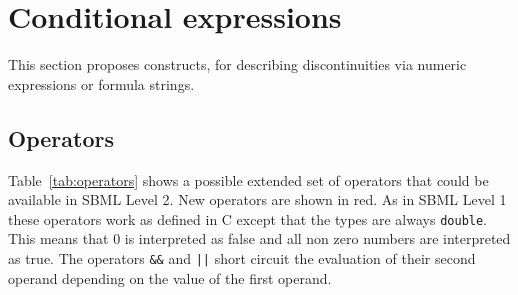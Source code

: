 \documentclass{cekarticle}
\begin{document}
\section{Conditional expressions}
\label{sec:conditional}

This section proposes constructs, for describing discontinuities
via numeric expressions or formula strings.

\subsection{Operators}
Table~\ref{tab:operators} shows a possible extended set of operators that could be
available in SBML Level 2.  New operators are shown in red.  As in
SBML Level 1 these operators work as defined in C except that the
types are always \texttt{double}.  This means that 0 is
interpreted as false and all non zero numbers are interpreted as
true.  The operators \verb|&&| and \verb+||+ short circuit the
evaluation of their second operand depending on the value of the
first operand.
\end{document}
